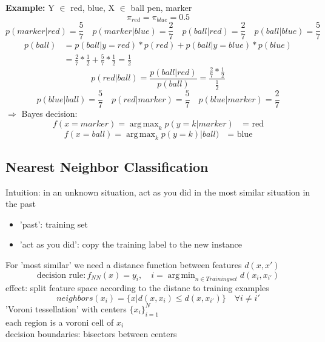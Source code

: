 \documentclass[11pt]{article}
\DeclareMathOperator*{\argmin}{arg\,min}
\DeclareMathOperator*{\argmax}{arg\,max}
\begin{document}
      \textbf{Example:} Y $\in$ {red, blue}, X $\in$ {ball pen, marker}
      \begin{equation*}
        \pi_{red} = \pi_{blue} = 0.5
      \end{equation*}
      \begin{equation*}
        p(marker|red) = \frac{5}{7} \quad p(marker|blue) = \frac{2}{7} \quad
        p(ball|red) = \frac{2}{7} \quad p(ball|blue) = \frac{5}{7}
      \end{equation*}
      \begin{equation*}
        \begin{align*}
          p(ball) &= p(ball|y = red)*p(red) + p(ball|y = blue)*p(blue) \\
          &= \frac{2}{7} * \frac{1}{2} + \frac{5}{7} * \frac{1}{2} = \frac{1}{2}
        \end{align*}
      \end{equation*}
      \begin{equation*}
        p(red|ball) = \frac{p(ball|red)}{p(ball)} = \frac{\frac{2}{7} * \frac{1}{2}}{\frac{1}{2}}
      \end{equation*}
      \begin{equation*}
        p(blue|ball) = \frac{5}{7} \quad p(red|marker) = \frac{5}{7} \quad p(blue|marker) = \frac{2}{7}
      \end{equation*}
      $\Rightarrow$ Bayes decision: \\
      \begin{equation*}
        f(x=marker) = \argmax_{k} p(y=k|marker) \quad \text{= red}
      \end{equation*}
      \begin{equation*}
        f(x=ball) = \argmax_{k} p(y=k)|ball)\quad \text{= blue}
      \end{equation*}
    \subsection{Nearest Neighbor Classification}
      Intuition: in an unknown situation, act as you did in the most similar situation in the past
      \begin{itemize}
        \item 'past': training set
        \item 'act as you did': copy the training label to the new instance
      \end{itemize}
      For 'most similar' we need  a distance function between features $d(x, x')$
      \begin{equation*}
        \text{decision rule}: f_{NN}(x) = y_{i}, \quad i = \argmin_{n \in Training set} d(x_{i}, x_{i'})
      \end{equation*}
      effect: split feature space according to the distanc to training examples
      \begin{equation*}
        neighbors(x_{i}) = \{ x|d(x, x_{i}) \leq d(x, x_{i'}) \} \quad \forall i \neq i'
      \end{equation*}
      'Voroni tessellation' with centers $\{ x_{i} \} _{i=1}^N$ \\
      each region is a voroni cell of $x_{i}$ \\
      decision boundaries: bisectors between centers
\end{document}

